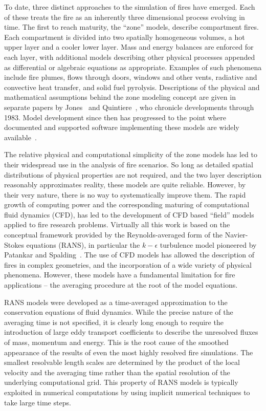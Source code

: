 \documentclass[11pt]{book}
\begin{document}
To date, three distinct approaches to the simulation of fires have emerged.
Each of these treats the fire as an inherently three dimensional process evolving in time.
The first to reach maturity, the ``zone'' models, describe compartment fires.
Each compartment is divided into two spatially homogeneous volumes, a hot upper layer and a cooler lower layer.
Mass and energy balances are enforced for each layer, with additional models describing other
physical processes appended as differential or algebraic equations as appropriate.
Examples of such phenomena include fire plumes, flows through doors, windows and other vents,
radiative and convective heat transfer, and solid fuel pyrolysis.
Descriptions of the physical and mathematical assumptions
behind the zone modeling concept are given in separate papers by Jones~\cite{Jones:1} and Quintiere~\cite{Quintiere:1},
who chronicle developments through 1983.
Model development since then has progressed to the point where
documented and supported software implementing these models are widely available~\cite{Forney:1}.

The relative physical and computational simplicity of the zone models has led to their
widespread use in the analysis of fire scenarios. So long as detailed spatial
distributions of physical properties are not required, and the two layer description
reasonably approximates reality, these models are quite reliable.
However, by their very nature, there is no way to systematically improve them.
The rapid growth of computing power and the corresponding maturing of computational
fluid dynamics (CFD), has led to the development of CFD based ``field'' models applied to fire research problems.
Virtually all this work is based on the conceptual framework provided by the Reynolds-averaged form of the
Navier-Stokes equations (RANS), in particular the $k -\epsilon$ turbulence model pioneered by
Patankar and Spalding~\cite{Patankar:1}. The use of CFD models has allowed
the description of fires in complex geometries, and the incorporation of a wide variety of
physical phenomena. However, these models have a fundamental limitation for fire applications --
the averaging procedure at the root of the model equations.

RANS models were developed as a time-averaged approximation to the conservation equations of fluid dynamics.
While the precise nature of the averaging time is not specified, it is clearly long enough to
require the introduction of large eddy transport coefficients to describe the unresolved fluxes of mass,
momentum and energy. This is the root cause of the smoothed appearance of the results of even the most
highly resolved fire simulations. The smallest resolvable length scales are determined by the product
of the local velocity and the averaging time rather than the spatial resolution of the underlying computational grid.
This property of RANS models is typically exploited in numerical computations by using implicit
numerical techniques to take large time steps.
\end{document}
